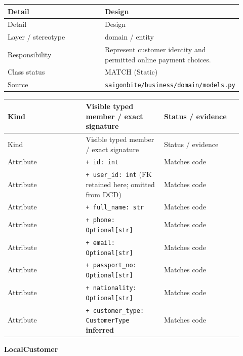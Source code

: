 \begin{longtable}{>{\raggedright\arraybackslash}p{0.4600\linewidth}>{\raggedright\arraybackslash}p{0.4600\linewidth}}
Detail & Design \\
\hline\endfirsthead
Detail & Design \\
\hline\endhead
Layer / stereotype & domain / \guillemotleft{}entity\guillemotright{} \\
Responsibility & Represent customer identity and permitted online payment choices. \\
Class status & MATCH (Static) \\
Source & \texttt{saigonbite/\allowbreak{}business/\allowbreak{}domain/\allowbreak{}models.\allowbreak{}py} \\
\end{longtable}
\begin{longtable}{>{\raggedright\arraybackslash}p{0.3067\linewidth}>{\raggedright\arraybackslash}p{0.3067\linewidth}>{\raggedright\arraybackslash}p{0.3067\linewidth}}
Kind & Visible typed member / exact signature & Status / evidence \\
\hline\endfirsthead
Kind & Visible typed member / exact signature & Status / evidence \\
\hline\endhead
Attribute & \texttt{+ id: int} & Matches code \\
Attribute & \texttt{+ user\_\allowbreak{}id: int} (FK retained here; omitted from DCD) & Matches code \\
Attribute & \texttt{+ full\_\allowbreak{}name: str} & Matches code \\
Attribute & \texttt{+ phone: Optional[str]} & Matches code \\
Attribute & \texttt{+ email: Optional[str]} & Matches code \\
Attribute & \texttt{+ passport\_\allowbreak{}no: Optional[str]} & Matches code \\
Attribute & \texttt{+ nationality: Optional[str]} & Matches code \\
Attribute & \texttt{+ customer\_\allowbreak{}type: CustomerType} \textbf{inferred} & Matches code \\
\end{longtable}
\textbf{LocalCustomer}

